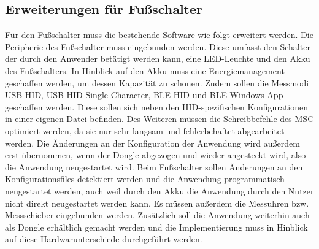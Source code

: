 \subsection{Erweiterungen für Fußschalter}
Für den Fußschalter muss die bestehende Software wie folgt erweitert werden. Die Peripherie des Fußschalter muss eingebunden werden. Diese umfasst den Schalter der durch den Anwender betätigt werden kann, eine LED-Leuchte und den Akku des Fußschalters. In Hinblick auf den Akku muss eine Energiemanagement geschaffen werden, um dessen Kapazität zu schonen. Zudem sollen die Messmodi USB-HID, USB-HID-Single-Character, BLE-HID und BLE-Windows-App geschaffen werden. Diese sollen sich neben den HID-spezifischen Konfigurationen in einer eigenen Datei befinden. Des Weiteren müssen die Schreibbefehle des MSC optimiert werden, da sie nur sehr langsam und fehlerbehaftet abgearbeitet werden. Die Änderungen an der Konfiguration der Anwendung wird außerdem erst übernommen, wenn der Dongle abgezogen und wieder angesteckt wird, also die Anwendung neugestartet wird. Beim Fußschalter sollen Änderungen an den Konfigurationsfiles detektiert werden und die Anwendung programmatisch neugestartet werden, auch weil durch den Akku die Anwendung durch den Nutzer nicht direkt neugestartet werden kann. Es müssen außerdem die Messuhren bzw. Messschieber eingebunden werden. Zusätzlich soll die Anwendung weiterhin auch als Dongle erhältlich gemacht werden und die Implementierung muss in Hinblick auf diese Hardwarunterschiede durchgeführt werden.